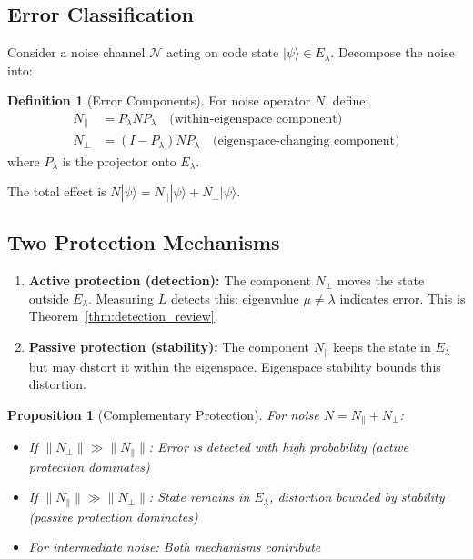 \documentclass[11pt,a4paper]{article}
\newtheorem{proposition}[theorem]{Proposition}
\theoremstyle{definition}
\newtheorem{definition}[theorem]{Definition}
\newcommand{\ket}[1]{|#1\rangle}
\begin{document}
\subsection{Error Classification}

Consider a noise channel $\mathcal{N}$ acting on code state $\ket{\psi} \in E_\lambda$. Decompose the noise into:

\begin{definition}[Error Components]
For noise operator $N$, define:
\begin{align}
    N_{\parallel} &= P_\lambda N P_\lambda \quad \text{(within-eigenspace component)} \\
    N_{\perp} &= (I - P_\lambda) N P_\lambda \quad \text{(eigenspace-changing component)}
\end{align}
where $P_\lambda$ is the projector onto $E_\lambda$.
\end{definition}

The total effect is $N\ket{\psi} = N_\parallel\ket{\psi} + N_\perp\ket{\psi}$.

\subsection{Two Protection Mechanisms}

\begin{enumerate}
    \item \textbf{Active protection (detection):} The component $N_\perp$ moves the state outside $E_\lambda$. Measuring $L$ detects this: eigenvalue $\mu \neq \lambda$ indicates error. This is Theorem~\ref{thm:detection_review}.
    
    \item \textbf{Passive protection (stability):} The component $N_\parallel$ keeps the state in $E_\lambda$ but may distort it within the eigenspace. Eigenspace stability bounds this distortion.
\end{enumerate}

\begin{proposition}[Complementary Protection]
\label{prop:complementary}
For noise $N = N_\parallel + N_\perp$:
\begin{itemize}[noitemsep]
    \item If $\|N_\perp\| \gg \|N_\parallel\|$: Error is detected with high probability (active protection dominates)
    \item If $\|N_\parallel\| \gg \|N_\perp\|$: State remains in $E_\lambda$, distortion bounded by stability (passive protection dominates)
    \item For intermediate noise: Both mechanisms contribute
\end{itemize}
\end{proposition}
\end{document}
